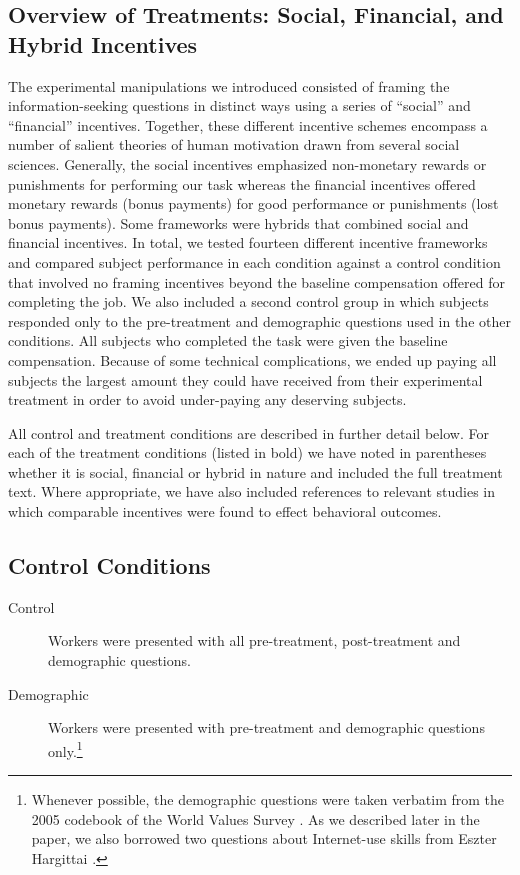 \documentclass{cscw2010}
\begin{document}
\subsection{Overview of Treatments: Social, Financial, and Hybrid Incentives}

The experimental manipulations we introduced consisted of framing the
information-seeking questions in distinct ways using a series of ``social''
and ``financial'' incentives. Together, these different incentive
schemes encompass a number of salient theories of human motivation drawn from
several social sciences. Generally,
the social incentives emphasized non-monetary rewards or
punishments for performing our task whereas the
financial incentives offered monetary rewards (bonus payments)
for good performance or punishments (lost bonus payments). Some
frameworks were hybrids that combined social and financial
incentives. In total, we tested fourteen different incentive
frameworks and compared subject performance in each condition against a
control condition that involved no framing incentives beyond the
baseline compensation offered for completing the job. We also included
a second control group in which subjects responded only to the
pre-treatment and demographic questions used in the other
conditions. All subjects who completed the task were given the baseline
compensation. Because of some technical complications, we ended up
paying all subjects the largest amount they could have received from
their experimental treatment in order to avoid under-paying any
deserving subjects.

All control and treatment conditions are described in further detail
below. For each of the treatment conditions (listed in bold) we have
noted in parentheses whether it is social, financial or hybrid in
nature and included the full treatment text. Where appropriate, we
have also included references to relevant studies in which comparable
incentives were found to effect behavioral outcomes.

\subsection{Control Conditions} 

\begin{description}
\item[Control] Workers were presented with all pre-treatment, post-treatment and demographic questions.
\item[Demographic] Workers were presented with pre-treatment and demographic questions only.\footnote{Whenever possible, the demographic questions were taken verbatim from the 2005 codebook of the World Values Survey \cite{world_vals_survey2009}. As we described later in the paper, we also borrowed two questions about Internet-use skills from Eszter Hargittai \cite{hargittai2009update}.}
\end{description}
\end{document}
